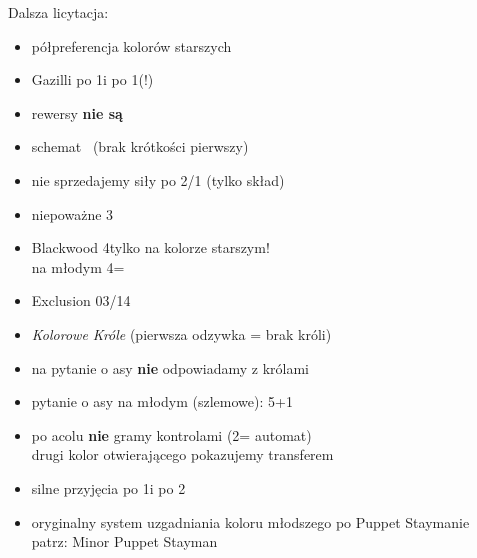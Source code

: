\documentclass[12pt, a4paper]{report}
\begin{document}
{    Dalsza licytacja:
    \begin{itemize}
        \item półpreferencja kolorów starszych
        \item Gazilli po 1\major i po 1\diams (!)
        \item rewersy \textbf{nie są} \gf
        \item schemat \lsf\ (brak krótkości pierwszy)
        \item nie sprzedajemy siły po 2/1 (tylko skład)
        \item niepoważne 3\nt
        \item Blackwood 4\nt tylko na kolorze starszym!\\
        na młodym 4\nt = \nat
        \item Exclusion 03/14
        \item \textit{Kolorowe Króle} (pierwsza odzywka  = brak króli)
        \item na pytanie o asy \textbf{nie} odpowiadamy z królami
        \item pytanie o asy na młodym (szlemowe): 5\minor+1
        \item po acolu \textbf{nie} gramy kontrolami (2\diams = automat)\\
        drugi kolor otwierającego pokazujemy transferem
        \item silne przyjęcia po 1\nt i po 2\nt
        \item oryginalny system uzgadniania koloru młodszego po Puppet Staymanie\\
        patrz: Minor Puppet Stayman
    \end{itemize}

}
\end{document}
